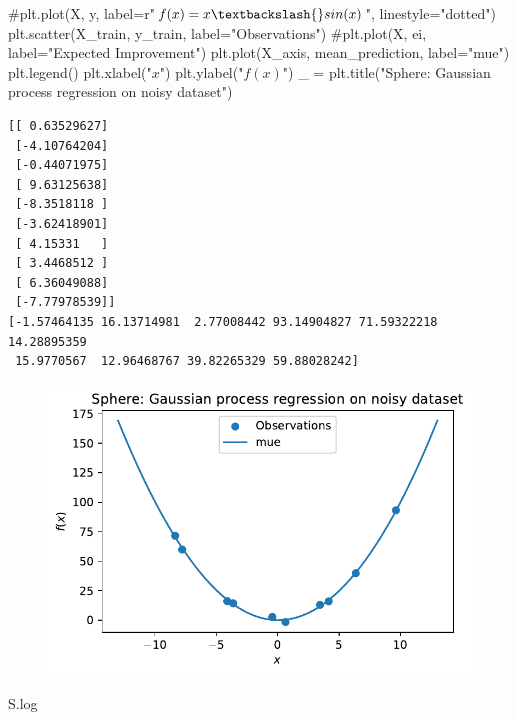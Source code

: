 \documentclass[
  letterpaper,
  DIV=11,
  numbers=noendperiod]{scrreprt}
\newenvironment{Shaded}{\begin{snugshade}}{\end{snugshade}}
\newcommand{\CommentTok}[1]{\textcolor[rgb]{0.37,0.37,0.37}{#1}}
\newcommand{\NormalTok}[1]{\textcolor[rgb]{0.00,0.23,0.31}{#1}}
\newcommand{\OperatorTok}[1]{\textcolor[rgb]{0.37,0.37,0.37}{#1}}
\newcommand{\StringTok}[1]{\textcolor[rgb]{0.13,0.47,0.30}{#1}}
\begin{document}
\begin{Shaded}
\begin{Highlighting}[]
\CommentTok{\#plt.plot(X, y, label=r"$f(x) = x \textbackslash{}sin(x)$", linestyle="dotted")}
\NormalTok{plt.scatter(X\_train, y\_train, label}\OperatorTok{=}\StringTok{"Observations"}\NormalTok{)}
\CommentTok{\#plt.plot(X, ei, label="Expected Improvement")}
\NormalTok{plt.plot(X\_axis, mean\_prediction, label}\OperatorTok{=}\StringTok{"mue"}\NormalTok{)}
\NormalTok{plt.legend()}
\NormalTok{plt.xlabel(}\StringTok{"$x$"}\NormalTok{)}
\NormalTok{plt.ylabel(}\StringTok{"$f(x)$"}\NormalTok{)}
\NormalTok{\_ }\OperatorTok{=}\NormalTok{ plt.title(}\StringTok{"Sphere: Gaussian process regression on noisy dataset"}\NormalTok{)}
\end{Highlighting}
\end{Shaded}

\begin{verbatim}
[[ 0.63529627]
 [-4.10764204]
 [-0.44071975]
 [ 9.63125638]
 [-8.3518118 ]
 [-3.62418901]
 [ 4.15331   ]
 [ 3.4468512 ]
 [ 6.36049088]
 [-7.77978539]]
[-1.57464135 16.13714981  2.77008442 93.14904827 71.59322218 14.28895359
 15.9770567  12.96468767 39.82265329 59.88028242]
\end{verbatim}

\begin{figure}[H]

{\centering \includegraphics{07_spot_ei_files/figure-pdf/cell-50-output-2.pdf}

}

\end{figure}

\begin{Shaded}
\begin{Highlighting}[]
\NormalTok{S.log}
\end{Highlighting}
\end{Shaded}
\end{document}
